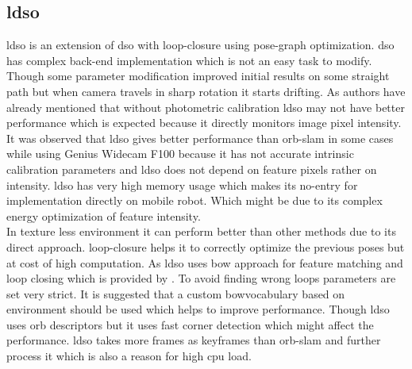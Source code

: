 \subsection{\acrshort{ldso}}
\acrshort{ldso} is an extension of \acrshort{dso} with loop-closure using pose-graph optimization. \acrshort{dso} has complex back-end implementation which is not an easy task to modify. Though some parameter modification improved initial results on some straight path but when camera travels in sharp rotation it starts drifting. As authors have already mentioned \cite{yang2018challenges} that without photometric calibration \acrshort{ldso} may not have better performance which is expected because it directly monitors image pixel intensity.\\
\newline It was observed that \acrshort{ldso} gives better performance than \acrshort{orb}-\acrshort{slam} in some cases while using Genius Widecam F100 because it has not accurate intrinsic calibration parameters and \acrshort{ldso} does not depend on feature pixels rather on intensity. \acrshort{ldso} has very high memory usage which makes its no-entry for implementation directly on mobile robot. Which might be due to its complex energy optimization of feature intensity.\\
\newline In texture less environment it can perform better than other methods due to its direct approach. loop-closure helps it to correctly optimize the previous poses but at cost of high computation. As \acrshort{ldso} uses \acrlong{bow} approach for feature matching and loop closing which is provided by \cite{DboW}. To avoid finding wrong loops parameters are set very strict. It is suggested that a custom \acrlong{bow}vocabulary based on environment should be used which helps to improve performance. Though \acrshort{ldso} uses \acrshort{orb} descriptors but it uses \acrshort{fast} corner detection which might affect the performance. \acrshort{ldso} takes more frames as keyframes than \acrshort{orb}-\acrshort{slam} and further process it which is also a reason for high \acrshort{cpu} load.

